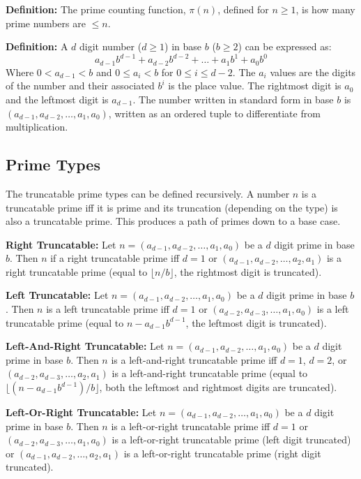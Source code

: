 \documentclass[12pt]{article}
\begin{document}
\textbf{Definition:} The prime counting function, $\pi(n)$, defined for $n\geq1$, is how many prime numbers are $\leq n$.

\textbf{Definition:} A $d$ digit number ($d\geq1$) in base $b$ ($b\geq2$) can be expressed as:
$$ a_{d-1}b^{d-1} + a_{d-2}b^{d-2} + \ldots + a_1b^1 + a_0b^0 $$
Where $0<a_{d-1}<b$ and $0\leq a_i<b$ for $0\leq i\leq d-2$. The $a_i$ values are the digits of the number and their associated $b^i$ is the place value. The rightmost digit is $a_0$ and the leftmost digit is $a_{d-1}$. The number written in standard form in base $b$ is $(a_{d-1},a_{d-2},\ldots,a_1,a_0)$, written as an ordered tuple to differentiate from multiplication.

\subsection{Prime Types}

The truncatable prime types can be defined recursively. A number $n$ is a truncatable prime iff it is prime and its truncation (depending on the type) is also a truncatable prime. This produces a path of primes down to a base case.

\textbf{Right Truncatable:} Let $n=(a_{d-1},a_{d-2},\ldots,a_1,a_0)$ be a $d$ digit prime in base $b$. Then $n$ if a right truncatable prime iff $d=1$ or $(a_{d-1},a_{d-2},\ldots,a_2,a_1)$ is a right truncatable prime (equal to $\lfloor n/b\rfloor$, the rightmost digit is truncated).

\textbf{Left Truncatable:} Let $n=(a_{d-1},a_{d-2},\ldots,a_1,a_0)$ be a $d$ digit prime in base $b$. Then $n$ is a left truncatable prime iff $d=1$ or $(a_{d-2},a_{d-3},\ldots,a_1,a_0)$ is a left truncatable prime (equal to $n-a_{d-1}b^{d-1}$, the leftmost digit is truncated).

\textbf{Left-And-Right Truncatable:} Let $n=(a_{d-1},a_{d-2},\ldots,a_1,a_0)$ be a $d$ digit prime in base $b$. Then $n$ is a left-and-right truncatable prime iff $d=1$, $d=2$, or $(a_{d-2},a_{d-3},\ldots,a_2,a_1)$ is a left-and-right truncatable prime (equal to $\lfloor(n-a_{d-1}b^{d-1})/b\rfloor$, both the leftmost and rightmost digits are truncated).

\textbf{Left-Or-Right Truncatable:} Let $n=(a_{d-1},a_{d-2},\ldots,a_1,a_0)$ be a $d$ digit prime in base $b$. Then $n$ is a left-or-right truncatable prime iff $d=1$ or $(a_{d-2},a_{d-3},\ldots,a_1,a_0)$ is a left-or-right truncatable prime (left digit truncated) or $(a_{d-1},a_{d-2},\ldots,a_2,a_1)$ is a left-or-right truncatable prime (right digit truncated).
\end{document}
